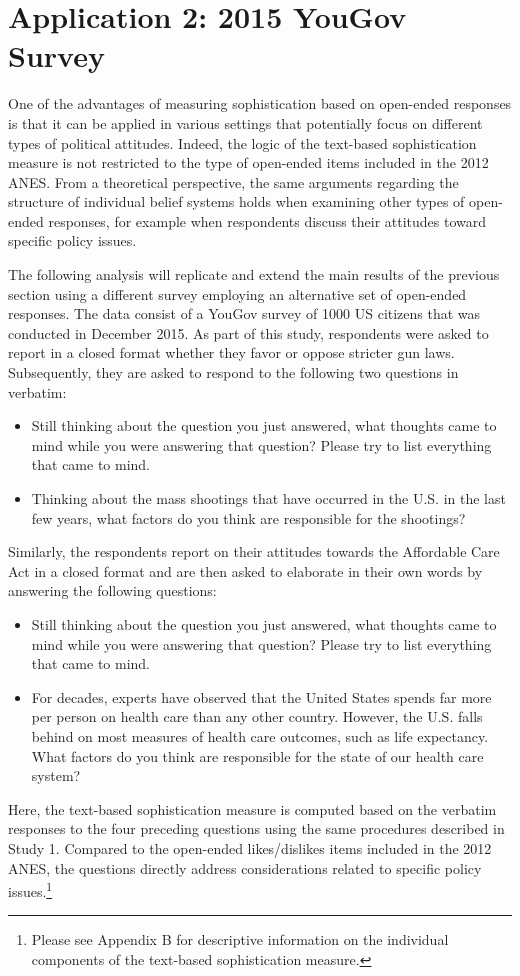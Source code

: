 \documentclass[12pt]{article}
\begin{document}
\section*{Application 2: 2015 YouGov Survey}

One of the advantages of measuring sophistication based on open-ended responses is that it can be applied in various settings that potentially focus on different types of political attitudes. Indeed, the logic of the text-based sophistication measure is not restricted to the type of open-ended items included in the 2012 ANES. From a theoretical perspective, the same arguments regarding the structure of individual belief systems holds when examining other types of open-ended responses, for example when respondents discuss their attitudes toward specific policy issues.

The following analysis will replicate and extend the main results of the previous section using a different survey employing an alternative set of open-ended responses. The data consist of a YouGov survey of 1000 US citizens that was conducted in December 2015. As part of this study, respondents were asked to report in a closed format whether they favor or oppose stricter gun laws. Subsequently, they are asked to respond to the following two questions in verbatim:
\begin{itemize}
\item Still thinking about the question you just answered, what thoughts came to mind while you were answering that question? Please try to list everything that came to mind.
\item Thinking about the mass shootings that have occurred in the U.S. in the last few years, what factors do you think are responsible for the shootings?
\end{itemize}
Similarly, the respondents report on their attitudes towards the Affordable Care Act in a closed format and are then asked to elaborate in their own words by answering the following questions:
\begin{itemize}
\item Still thinking about the question you just answered, what thoughts came to mind while you were answering that question? Please try to list everything that came to mind.
\item For decades, experts have observed that the United States spends far more per person on health care than any other country. However, the U.S. falls behind on most measures of health care outcomes, such as life expectancy. What factors do you think are responsible for the state of our health care system?
\end{itemize}
Here, the text-based sophistication measure is computed based on the verbatim responses to the four preceding questions using the same procedures described in Study 1. Compared to the open-ended likes/dislikes items included in the 2012 ANES, the questions directly address considerations related to specific policy issues.\footnote{Please see Appendix B for descriptive information on the individual components of the text-based sophistication measure.}
\end{document}
